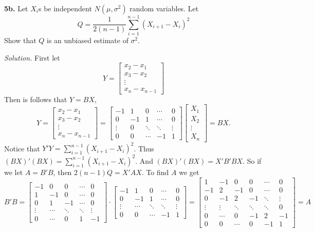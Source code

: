 \documentclass{article}
\begin{document}
\newpage 
\textbf{5b.} Let \(X_i\)s be independent \(N(\mu, \sigma^2)\) random variables. Let \[
Q = \frac{1}{2(n-1)} \sum_{i=1}^{n-1} (X_{i+1} -X_{i} )^2
\]
Show that \(Q\) is an unbiased estimate of \(\sigma^2\). 

\vspace{3mm} 
\textit{Solution.} First let 
\[Y=
\begin{bmatrix}
x_2-x_1 \\
x_3-x_2\\
\vdots\\
x_n-x_{n-1}
\end{bmatrix}
\]Then is follows that \(Y = BX\), 
\[
Y=
\begin{bmatrix}
x_2-x_1 \\
x_3-x_2\\
\vdots\\
x_n-x_{n-1}
\end{bmatrix}
=
\begin{bmatrix}
-1 & 1 & 0 & \cdots & 0\\
0 & -1& 1 & \cdots & 0 \\
\vdots & 0& \ddots & \ddots &\vdots\\
0 &0& \cdots & -1&1
\end{bmatrix}
\begin{bmatrix}
X_1\\
X_2\\
\vdots\\
X_n
\end{bmatrix} = BX.
\]
Notice that \(Y'Y= \sum_{i=1}^{n-1} (X_{i+1} -X_{i} )^2 \). Thus \((BX)'(BX) =  \sum_{i=1}^{n-1} (X_{i+1} -X_{i} )^2 \). And \((BX)'(BX) = X'B'BX\). So if we let \(A=B'B\), then \(2(n-1)Q=X'AX\). To find \(A\) we get
\[
B'B=
\begin{bmatrix}
-1 & 0 &0& \cdots & 0\\
1 & -1 &0 &\cdots &0 \\
0 & 1 & -1 &  \cdots &0\\
\vdots&\cdots& \ddots&\ddots &\vdots \\
0&\cdots&0& 1&-1 
\end{bmatrix}\cdot
\begin{bmatrix}
-1 & 1 & 0 & \cdots & 0\\
0 & -1& 1 & \cdots & 0 \\
\vdots & \cdots& \ddots & \ddots &\vdots\\
0 &0& \cdots & -1&1
\end{bmatrix}=
\begin{bmatrix}
1 & -1 & 0 & 0 & \cdots & 0 \\
-1 & 2 & -1 & 0 & \cdots&0 \\
0 & -1 & 2 & -1 & \ddots &\vdots \\
\vdots & \vdots & \ddots&\ddots &\ddots& 0\\
0&  \cdots & 0 &-1&2&-1 \\
0 & 0& \cdots & 0 & -1&1
\end{bmatrix}=A
\]
\end{document}
